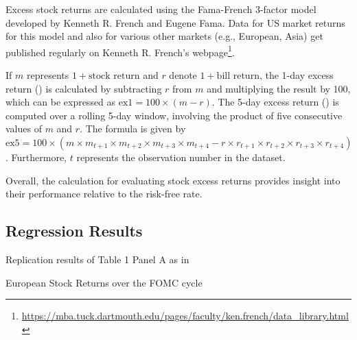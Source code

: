Excess stock returns are calculated using the Fama-French 3-factor model developed by Kenneth R. French and Eugene Fama.  
Data for US market returns for this model and also for various other markets (e.g., European, Asia) get published regularly on Kenneth R. French's webpage\footnote{\url{https://mba.tuck.dartmouth.edu/pages/faculty/ken.french/data_library.html}}.

If \(m\) represents \(1 + \text{{stock return}}\) and \(r\) denote \(1 + \text{{bill return}}\), the 1-day excess return () is calculated by subtracting \(r\) from \(m\) and multiplying the result by 100, which can be expressed as \(\text{{ex1}} = 100 \times (m - r)\). 
The 5-day excess return () is computed over a rolling 5-day window, involving the product of five consecutive values of \(m\) and \(r\). The formula is given by \(\text{{ex5}} = 100 \times (m \times m_{t+1} \times m_{t+2} \times m_{t+3} \times m_{t+4} - r \times r_{t+1} \times r_{t+2} \times r_{t+3} \times r_{t+4})\).
Furthermore, \(t\) represents the observation number in the dataset. 

Overall, the calculation for evaluating stock excess returns provides insight into their 
performance relative to the risk-free rate.

\subsection{Regression Results}

\begin{table}[h]
\begin{center}
\begin{adjustbox}{width=1\textwidth}

\end{tabular}
}
\end{adjustbox}
\caption{\label{table_1} Replication results of Table 1 Panel A as in \parencite{cieslak_stock_2019}}
\end{center}
\end{table}

\begin{table}[h]
\begin{center}
\begin{adjustbox}{width=1\textwidth}

\end{tabular}
}
\end{adjustbox}
\caption{\label{table_2} European Stock Returns over the FOMC cycle}
\end{center}
\end{table}

